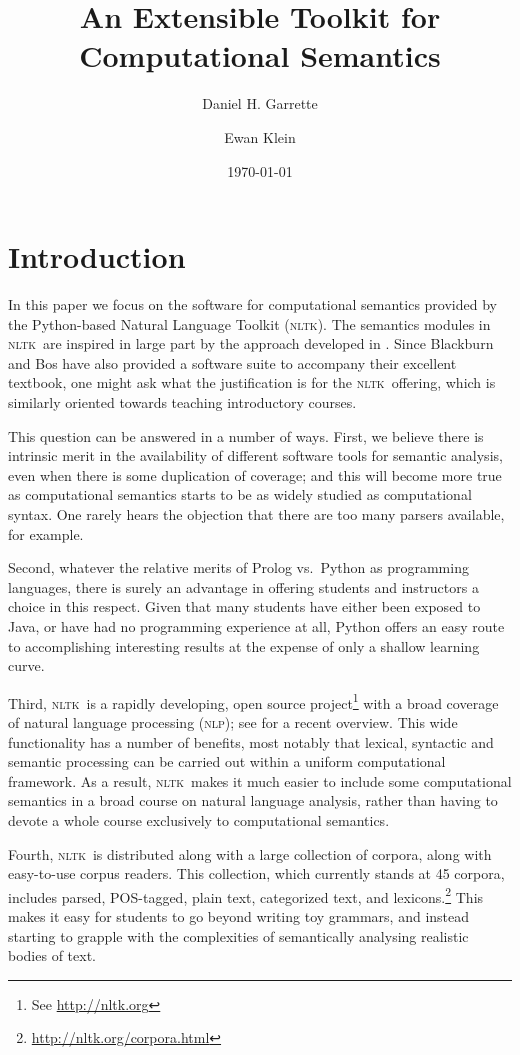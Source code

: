 \documentclass[11pt,a4paper]{article}
\newcommand{\NLP}{\textsc{nlp}}
\newcommand{\NLTK}{\textsc{nltk}}
\begin{document}
\title{An Extensible Toolkit for Computational Semantics}
\author{Daniel H. Garrette \and Ewan Klein}
\date{\today}
\maketitle

\section{Introduction}

In this paper we focus on the software for computational semantics provided
by the Python-based Natural Language Toolkit (\NLTK). The semantics
modules in \NLTK\ are
inspired in large part by the approach developed in \citet{BB}.
Since Blackburn and Bos have also provided a software suite to
accompany their excellent textbook, one might ask what the
justification is for the \NLTK\ offering, which is similarly oriented
towards teaching introductory courses.

This question can be answered in a number of ways. First, we believe
there is intrinsic merit in the availability of different
software tools for semantic analysis, even when there is some
duplication of coverage; and this will become more true as
computational semantics starts to be as widely studied as computational
syntax. One rarely hears the objection that there are too many
parsers available, for example. 

Second, whatever the relative merits of Prolog vs.\ Python as
programming languages, there is surely an advantage in offering
students and instructors a choice in this respect. Given that many
students have either been exposed to Java, or have had no programming
experience at all, Python offers an easy route to accomplishing
interesting results at the expense of only a shallow learning curve.

Third, \NLTK\ is a rapidly developing, open source
project\footnote{See \url{http://nltk.org}} with a broad coverage of
natural language processing (\NLP); see \citet{Multidisciplinary} for
a recent overview. This wide functionality has a number of benefits,
most notably that lexical, syntactic and semantic processing can be
carried out within a uniform computational framework. As a result,
\NLTK\ makes it much easier to include some computational semantics in
a broad course on natural language analysis, rather than having to
devote a whole course exclusively to computational semantics.

Fourth, \NLTK\ is distributed along with a
large collection of corpora, along with easy-to-use corpus readers.
This collection, which currently stands at 45 corpora, includes
parsed, POS-tagged, plain text, categorized text, and
lexicons.\footnote{\url{http://nltk.org/corpora.html}} This makes it
easy for students to go beyond writing toy grammars, and instead
starting to grapple with the complexities of semantically analysing
realistic bodies of text.
\end{document}
